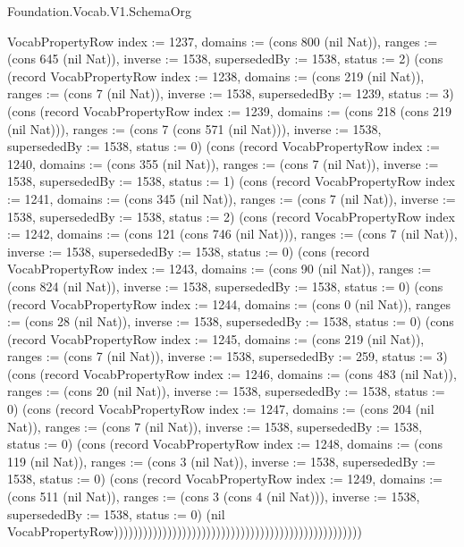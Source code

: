 \begin{lexlean}{Foundation.Vocab.V1.SchemaOrg}
\begin{semanticmodule}
{VocabPropertyRow {index := 1237, domains := (cons 800 (nil Nat)), ranges := (cons 645 (nil Nat)), inverse := 1538, supersededBy := 1538, status := 2}) (cons (record VocabPropertyRow {index := 1238, domains := (cons 219 (nil Nat)), ranges := (cons 7 (nil Nat)), inverse := 1538, supersededBy := 1239, status := 3}) (cons (record VocabPropertyRow {index := 1239, domains := (cons 218 (cons 219 (nil Nat))), ranges := (cons 7 (cons 571 (nil Nat))), inverse := 1538, supersededBy := 1538, status := 0}) (cons (record VocabPropertyRow {index := 1240, domains := (cons 355 (nil Nat)), ranges := (cons 7 (nil Nat)), inverse := 1538, supersededBy := 1538, status := 1}) (cons (record VocabPropertyRow {index := 1241, domains := (cons 345 (nil Nat)), ranges := (cons 7 (nil Nat)), inverse := 1538, supersededBy := 1538, status := 2}) (cons (record VocabPropertyRow {index := 1242, domains := (cons 121 (cons 746 (nil Nat))), ranges := (cons 7 (nil Nat)), inverse := 1538, supersededBy := 1538, status := 0}) (cons (record VocabPropertyRow {index := 1243, domains := (cons 90 (nil Nat)), ranges := (cons 824 (nil Nat)), inverse := 1538, supersededBy := 1538, status := 0}) (cons (record VocabPropertyRow {index := 1244, domains := (cons 0 (nil Nat)), ranges := (cons 28 (nil Nat)), inverse := 1538, supersededBy := 1538, status := 0}) (cons (record VocabPropertyRow {index := 1245, domains := (cons 219 (nil Nat)), ranges := (cons 7 (nil Nat)), inverse := 1538, supersededBy := 259, status := 3}) (cons (record VocabPropertyRow {index := 1246, domains := (cons 483 (nil Nat)), ranges := (cons 20 (nil Nat)), inverse := 1538, supersededBy := 1538, status := 0}) (cons (record VocabPropertyRow {index := 1247, domains := (cons 204 (nil Nat)), ranges := (cons 7 (nil Nat)), inverse := 1538, supersededBy := 1538, status := 0}) (cons (record VocabPropertyRow {index := 1248, domains := (cons 119 (nil Nat)), ranges := (cons 3 (nil Nat)), inverse := 1538, supersededBy := 1538, status := 0}) (cons (record VocabPropertyRow {index := 1249, domains := (cons 511 (nil Nat)), ranges := (cons 3 (cons 4 (nil Nat))), inverse := 1538, supersededBy := 1538, status := 0}) (nil VocabPropertyRow)))))))))))))))))))))))))))))))))))))))))))))))))))
}


\end{semanticmodule}
\end{lexlean}
